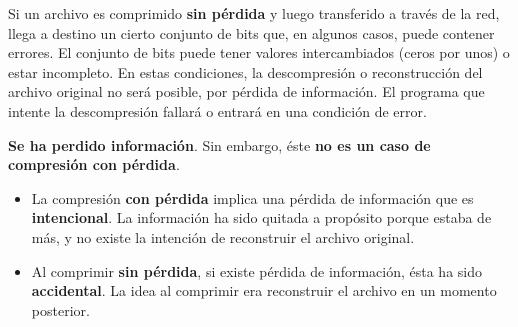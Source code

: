 \documentclass[spanish,a4paper,]{article}
\providecommand{\tightlist}{%
  \setlength{\itemsep}{0pt}\setlength{\parskip}{0pt}}
\begin{document}
Si un archivo es comprimido \textbf{sin pérdida} y luego transferido a
través de la red, llega a destino un cierto conjunto de bits que, en
algunos casos, puede contener errores. El conjunto de bits puede tener
valores intercambiados (ceros por unos) o estar incompleto. En estas
condiciones, la descompresión o reconstrucción del archivo original no
será posible, por pérdida de información. El programa que intente la
descompresión fallará o entrará en una condición de error.

\textbf{Se ha perdido información}. Sin embargo, éste \textbf{no es un
caso de compresión con pérdida}.

\begin{itemize}
\tightlist
\item
  La compresión \textbf{con pérdida} implica una pérdida de información
  que es \textbf{intencional}. La información ha sido quitada a
  propósito porque estaba de más, y no existe la intención de
  reconstruir el archivo original.
\item
  Al comprimir \textbf{sin pérdida}, si existe pérdida de información,
  ésta ha sido \textbf{accidental}. La idea al comprimir era reconstruir
  el archivo en un momento posterior.
\end{itemize}
\end{document}
